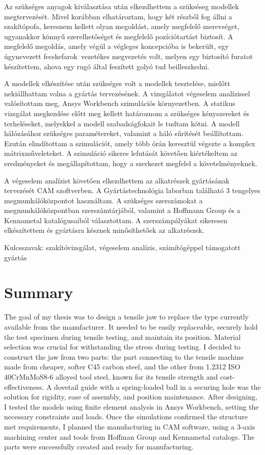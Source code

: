 \documentclass[12pt,a4paper,oneside]{report}
\begin{document}
Az szükséges anyagok kiválasztása után elkezdhettem a szükséseg modellek megtervezését. Mivel korábban elhatároztam, hogy két részből fog állni a szakítópofa, keresnem kellett olyan megoldást, amely megfelelő merevséget, ugyanakkor könnyű szerelhetőséget és megfelelő pozíciótartást biztosít. A megfelelő megoldás, amely végül a végleges koncepcióba is bekerült, egy úgynevezett \glqq fecskefarok\grqq\ vezetékes megvezetés volt, melyen egy biztosító furatot készítettem, ahova egy rugó által feszített golyó tud beilleszkedni.

A modellek elkészítése után szükséges volt a modellek tesztelése, mielőtt nekiállhattam volna a gyártás tervezésének. A vizsgálatot végeselem analízissel valósítottam meg, Ansys Workbench szimulációs környezetben. A statikus vizsgálat megkezdése előtt meg kellett határoznom a szükséges kényszereket és terheléseket, melyekkel a modell szabadságfokait le tudtam kötni. A modell hálózásához szükséges paramétereket, valamint a háló sűrítését beállítottam. Ezután elindítottam a szimulációt, amely több órán keresztül végezte a komplex mátrixműveleteket. A szimuláció sikeres lefutását követően kiértékeltem az eredményeket és megállapítottam, hogy a szerkezet megfelel a követelményeknek.

A végeselem analízist követően elkezdhettem az alkatrészek gyártásának tervezését CAM szoftverben. A Gyártástechnológia laborban található 3 tengelyes megmunkálóközpontot használtam. A szükséges szerszámokat a megmunkálóközpontban szerszámtárjából, valamint a Hoffmann Group és a Kennametal katalógusaiból választottam. A szerszámpályákat sikeresen elkészítettem és gyártásra késznek minősíthetőek az alkatrészek.

\noindent Kulcsszavak: szakítóvizsgálat, végeselem analízis, számítógéppel támogatott gyártás

\section{Summary}
The goal of my thesis was to design a tensile jaw to replace the type currently available from the manufacturer. It needed to be easily replaceable, securely hold the test specimen during tensile testing, and maintain its position. Material selection was crucial for withstanding the stress during testing. I decided to construct the jaw from two parts: the part connecting to the tensile machine made from cheaper, softer C45 carbon steel, and the other from 1.2312 ISO 40CrMnMoS8-6 alloyed tool steel, known for its tensile strength and cost-effectiveness. A dovetail guide with a spring-loaded ball in a securing hole was the solution for rigidity, ease of assembly, and position maintenance. After designing, I tested the models using finite element analysis in Ansys Workbench, setting the necessary constraints and loads. Once the simulations confirmed the structure met requirements, I planned the manufacturing in CAM software, using a 3-axis machining center and tools from Hoffman Group and Kennametal catalogs. The parts were successfully created and ready for manufacturing.
\end{document}
